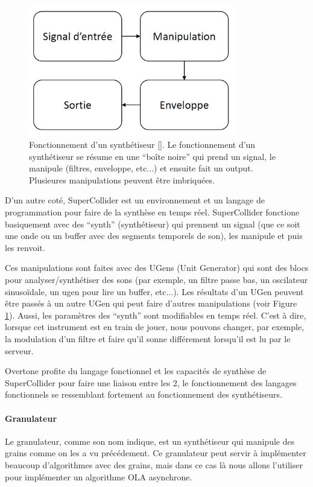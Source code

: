 \documentclass[letterpaper]{article}
\begin{document}
\begin{figure}[h]
    \centerline{\includegraphics[width=9cm]{res/synthetiseur.png}}
    \caption{\label{fig:synthetiseur}
      Fonctionnement d'un synthétiseur [\cite{TSMreview}].
      Le fonctionnement d'un synthétiseur se résume en une ``boîte noire'' qui prend
      un signal, le manipule (filtres, enveloppe, etc...) et ensuite fait un output.
      Plusieures manipulations peuvent être imbriquées.
    }
  \end{figure}

  D'un autre coté, SuperCollider est un environnement et un langage de programmation pour faire
  de la synthèse en temps réel. SuperCollider fonctione basiquement avec des ``synth'' (synthétiseur)
  qui prennent un signal (que ce soit une onde ou un buffer avec des segments temporels de son),
  les manipule et puis les renvoit.
  
  Ces manipulations sont faites avec des UGens (Unit Generator) qui sont des blocs pour
  analyser/synthétiser des sons (par exemple, un filtre passe bas, un oscilateur sinusoïdale,
  un ugen pour lire un buffer, etc...). Les résultats d'un UGen peuvent être passés à un autre UGen
  qui peut faire d'autres manipulations (voir Figure \ref{fig:synthetiseur}).
  Aussi, les paramètres des ``synth'' sont modifiables en temps réel. C'est à dire, lorsque cet
  instrument est en train de jouer, nous pouvons changer, par exemple, la modulation d'un filtre
  et faire qu'il sonne différement lorsqu'il est lu par le serveur.
  
  Overtone profite du langage fonctionnel et les capacités de synthèse de SuperCollider pour faire
  une liaison entre les 2, le fonctionnement des langages fonctionnels se ressemblant fortement
  au fonctionnement des synthétiseurs.

  \paragraph {Granulateur}
  Le granulateur, comme son nom indique, est un synthétiseur qui manipule des grains comme on les a vu
  précédement. Ce granulateur peut servir à implémenter beaucoup d'algorithmes avec des grains, mais
  dans ce cas là nous allons l'utiliser pour implémenter un  algorithme OLA asynchrone.
\end{document}
